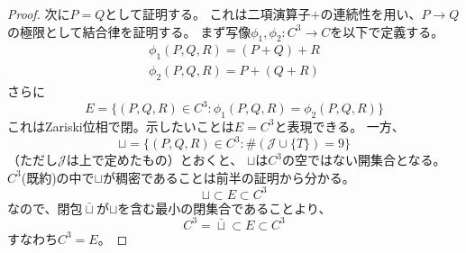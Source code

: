 \documentclass[a4]{article}
\begin{document}
\begin{proof}
            次に$P=Q$として証明する。
            これは二項演算子$+$の連続性を用い、$P \to Q$の極限として結合律を証明する。
            まず写像$\phi_1, \phi_2 : C^3 \to C$を以下で定義する。
            \begin{eqnarray}
                \phi_1(P, Q, R)=(P+Q)+R \\
                \phi_2(P, Q, R)=P+(Q+R)
            \end{eqnarray}
            さらに
            \[ E=\{ (P, Q, R) \in C^3 : \phi_1(P, Q, R)=\phi_2(P, Q, R) \} \]
            これはZariski位相で閉。示したいことは$E=C^3$と表現できる。
            一方、
            \[ \sqcup=\{ (P, Q, R) \in C^3 : \#(\mathcal{J} \cup \{T\})=9 \} \]
            （ただし$\mathcal{J}$は上で定めたもの）とおくと、
            $\sqcup$は$C^3$の空ではない開集合となる。
            $C^3$(既約)の中で$\sqcup$が稠密であることは前半の証明から分かる。
            \[ \sqcup \subset E \subset C^3 \]
            なので、閉包$\bar{\sqcup}$が$\sqcup$を含む最小の閉集合であることより、
            \[ C^3=\bar{\sqcup} \subset E \subset C^3 \]
            すなわち$C^3=E$。
        \end{proof}
\end{document}
